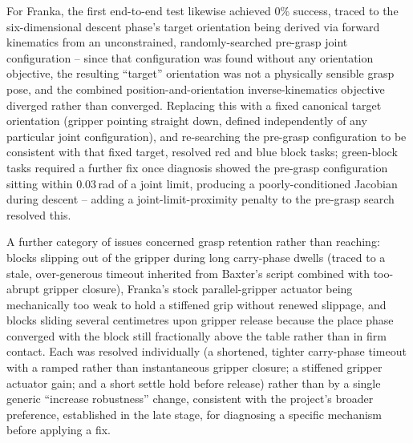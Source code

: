 \documentclass[12pt]{article}
\begin{document}
For Franka, the first end-to-end test likewise achieved 0\% success, traced to the six-dimensional descent phase's target orientation being derived via forward kinematics from an unconstrained, randomly-searched pre-grasp joint configuration -- since that configuration was found without any orientation objective, the resulting ``target'' orientation was not a physically sensible grasp pose, and the combined position-and-orientation inverse-kinematics objective diverged rather than converged. Replacing this with a fixed canonical target orientation (gripper pointing straight down, defined independently of any particular joint configuration), and re-searching the pre-grasp configuration to be consistent with that fixed target, resolved red and blue block tasks; green-block tasks required a further fix once diagnosis showed the pre-grasp configuration sitting within 0.03\,rad of a joint limit, producing a poorly-conditioned Jacobian during descent -- adding a joint-limit-proximity penalty to the pre-grasp search resolved this.

A further category of issues concerned grasp retention rather than reaching: blocks slipping out of the gripper during long carry-phase dwells (traced to a stale, over-generous timeout inherited from Baxter's script combined with too-abrupt gripper closure), Franka's stock parallel-gripper actuator being mechanically too weak to hold a stiffened grip without renewed slippage, and blocks sliding several centimetres upon gripper release because the place phase converged with the block still fractionally above the table rather than in firm contact. Each was resolved individually (a shortened, tighter carry-phase timeout with a ramped rather than instantaneous gripper closure; a stiffened gripper actuator gain; and a short settle hold before release) rather than by a single generic ``increase robustness'' change, consistent with the project's broader preference, established in the late stage, for diagnosing a specific mechanism before applying a fix.
\end{document}
